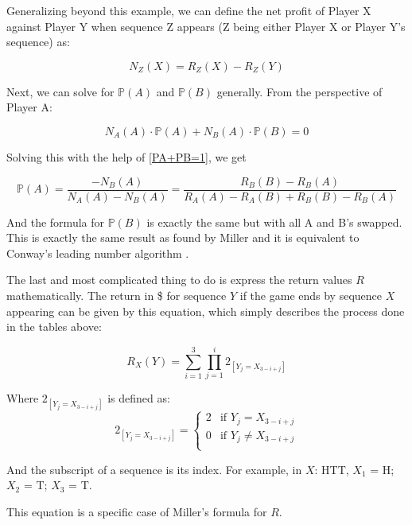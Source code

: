 \documentclass[english,12pt,a4paper,final]{article}
\begin{document}
Generalizing beyond this example, we can define the net profit of Player X against Player Y when sequence Z appears (Z being either Player X or Player Y's sequence) as:

\begin{equation}\label{NtwoPlayers}
	N_Z(X) = R_Z(X) - R_Z(Y)
\end{equation}

Next, we can solve for $\mathbb{P}(A)$ and $\mathbb{P}(B)$ generally. From the perspective of Player A:

\begin{equation*}
	N_A(A)\cdot\mathbb{P}(A) + N_B(A)\cdot\mathbb{P}(B) = 0
\end{equation*}

Solving this with the help of \eqref{PA+PB=1}, we get

\begin{equation}\label{PtwoPlayersFirst}
	\mathbb{P}(A) = \frac{-N_B(A)}{N_A(A)-N_B(A)} = \frac{R_B(B)-R_B(A)}{R_A(A)-R_A(B)+R_B(B)-R_B(A)}
\end{equation}

And the formula for $\mathbb{P}(B)$ is exactly the same but with all A and B's swapped. This is exactly the same result as found by Miller and it is equivalent to Conway's leading number algorithm \parencite{miller}.

The last and most complicated thing to do is express the return values $R$ mathematically. The return in \$ for sequence $Y$ if the game ends by sequence $X$ appearing can be given by this equation, which simply describes the process done in the tables above:

\begin{equation}\label{Rbasic}
	R_X(Y) = \sum_{i=1}^{3} \prod_{j=1}^{i} 2_{[Y_j = X_{3-i+j}]}
\end{equation}

Where $2_{[Y_j = X_{3-i+j}]}$ is defined as:
\begin{equation*}
	2_{[Y_j = X_{3-i+j}]} = \begin{cases}
		2 & \text{if } Y_j = X_{3-i+j} \\
		0 & \text{if } Y_j \neq X_{3-i+j} \\
	\end{cases}
\end{equation*}

And the subscript of a sequence is its index. For example, in $X$: HTT, $X_1$ = H; $X_2$ = T; $X_3$ = T.

This equation is a specific case of Miller's formula for $R$.
\end{document}
